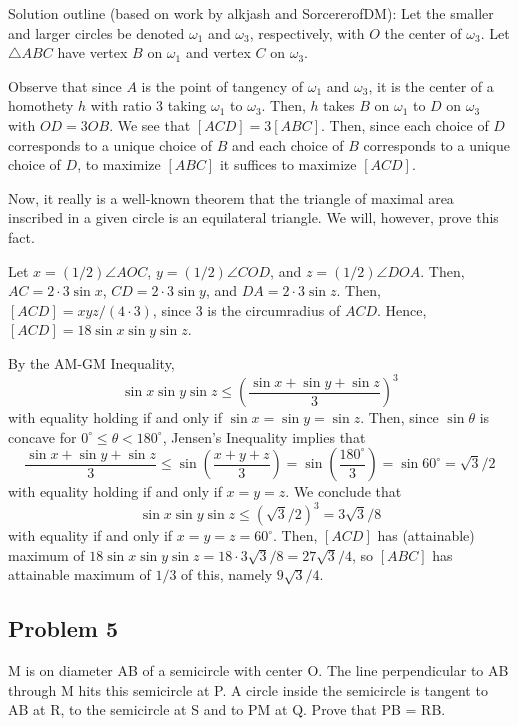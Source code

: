 \begin{mdsoln}
Solution outline (based on work by alkjash and SorcererofDM):
Let the smaller and larger circles be denoted $\omega_1$ and $\omega_3$, respectively, with $O$ the center of $\omega_3$. Let $\triangle ABC$ have vertex $B$ on $\omega_1$ and vertex $C$ on $\omega_3$.

Observe that since $A$ is the point of tangency of $\omega_1$ and $\omega_3$, it is the center of a homothety $h$ with ratio 3 taking $\omega_1$ to $\omega_3$. Then, $h$ takes $B$ on $\omega_1$ to $D$ on $\omega_3$ with $OD=3OB$. We see that $[ACD]=3[ABC]$. Then, since each choice of $D$ corresponds to a unique choice of $B$ and each choice of $B$ corresponds to a unique choice of $D$, to maximize $[ABC]$ it suffices to maximize $[ACD]$.

Now, it really is a well-known theorem that the triangle of maximal area inscribed in a given circle is an equilateral triangle. We will, however, prove this fact.

Let $x=(1/2)\angle AOC$, $y=(1/2)\angle COD$, and $z=(1/2)\angle DOA$. Then, $AC=2\cdot 3\sin x$, $CD=2\cdot 3\sin y$, and $DA=2\cdot 3\sin z$. Then, $[ACD]=xyz/(4\cdot 3)$, since 3 is the circumradius of $ACD$. Hence, $[ACD]=18\sin x\sin y\sin z$.

By the AM-GM Inequality,$$\sin x\sin y\sin z\le \left(\frac{\sin x+\sin y+\sin z}{3}\right)^3$$with equality holding if and only if $\sin x=\sin y=\sin z$. Then, since $\sin \theta$ is concave for $0^\circ\le \theta<180^\circ$, Jensen’s Inequality implies that$$\frac{\sin x+\sin y+\sin z}{3}\le \sin\left(\frac{x+y+z}{3}\right)=\sin\left(\frac{180^\circ}{3}\right)=\sin 60^\circ=\sqrt{3}/2$$with equality holding if and only if $x=y=z$. We conclude that$$\sin x\sin y\sin z\le (\sqrt{3}/2)^3=3\sqrt{3}/8$$with equality if and only if $x=y=z=60^\circ$. Then, $[ACD]$ has (attainable) maximum of $18\sin x\sin y\sin z=18\cdot 3\sqrt{3}/8=27\sqrt{3}/4$, so $[ABC]$ has attainable maximum of $1/3$ of this, namely $9\sqrt{3}/4$.
    
\end{mdsoln}

\subsection{Problem 5}

M is on diameter AB of a semicircle with center O. The line perpendicular to AB through M hits this semicircle at P. A circle inside the semicircle is tangent to AB at R, to the semicircle at S and to PM at Q. Prove that PB = RB.

